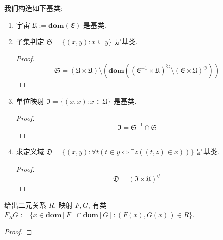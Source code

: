 \begin{definition}
    我们构造如下基类:
    \begin{enumerate}
        \item \label {definition:NBG basic class of universe}
                宇宙 \(\mathfrak{U} := \mathbf{dom} (\mathfrak{E})\) 是基类.
        \item \label {definition:NBG basic class of subset}
                子集判定 \(\mathfrak{S} = \{(x,y) : x \subseteq y\}\) 是基类.

                \begin{proof}
                    \[
                        \mathfrak{S} = (\mathfrak{U} \times \mathfrak{U}) \setminus (\mathbf{dom} ({(\mathfrak{E}^{-1} \times \mathfrak{U})}^{\circlearrowright} \setminus {(\mathfrak{E} \times \mathfrak{U})}^{\circlearrowleft}))
                    \]
                \end{proof}
        \item \label {definition:NBG basic class of id function}
                单位映射 \(\mathfrak{I} = \{(x,x) : x \in \mathfrak{U}\}\) 是基类.

                \begin{proof}
                    \[
                        \mathfrak{I} = \mathfrak{S}^{-1} \cap \mathfrak{S}
                    \]
                \end{proof}
        \item \label {definition:NBG basic class of domain}
                求定义域 \(\mathfrak{D} = \{(x,y) : \forall t (t \in y \Leftrightarrow \exists z ((t,z) \in x))\}\) 是基类.

                \begin{proof}
                    \[
                        \mathfrak{D} = {(\mathfrak{I} \times \mathfrak{U})}^{\circlearrowleft}
                    \]
                \end{proof}
    \end{enumerate}
\end{definition}

\begin{lemma}
    给出二元关系 \(R\), 映射 \(F, G\), 有类 \(F_R G := \{x \in \mathbf{dom}[F] \cap \mathbf{dom}[G] : (F(x),G(x)) \in R\}\).

    \begin{proof}
        
    \end{proof}
\end{lemma}

